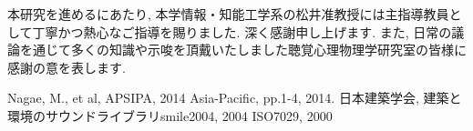 \documentclass[10pt,twocolumn,uplatex,dvipdfmx]{jsarticle} %
\begin{document}
本研究を進めるにあたり, 本学情報・知能工学系の松井准教授には主指導教員として丁寧かつ熱心なご指導を賜りました. 深く感謝申し上げます. また, 日常の議論を通じて多くの知識や示唆を頂戴いたしました聴覚心理物理学研究室の皆様に感謝の意を表します.


\begin{thebibliography}{9} %
\itemsep -5pt             %
 Nagae, M., et al, APSIPA, 2014 Asia-Pacific, pp.1-4, 2014.
 日本建築学会, 建築と環境のサウンドライブラリsmile2004, 2004
 ISO7029, 2000
\end{thebibliography}
\end{document}
